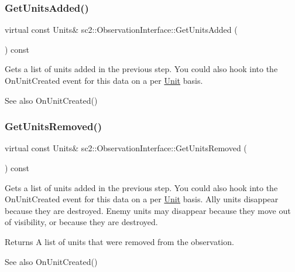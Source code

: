 \subsubsection{\texorpdfstring{Get\+Units\+Added()}{GetUnitsAdded()}}
{\footnotesize\ttfamily virtual const Units\& sc2\+::\+Observation\+Interface\+::\+Get\+Units\+Added (\begin{DoxyParamCaption}{ }\end{DoxyParamCaption}) const\hspace{0.3cm}{\ttfamily [pure virtual]}}

Gets a list of units added in the previous step. You could also hook into the On\+Unit\+Created event for this data on a per \hyperlink{classsc2_1_1_unit}{Unit} basis. \begin{DoxySeeAlso}{See also}
On\+Unit\+Created() 
\end{DoxySeeAlso}
\mbox{\label{classsc2_1_1_observation_interface_a656f51b87f1fafeeff37206345793476}} 
\subsubsection{\texorpdfstring{Get\+Units\+Removed()}{GetUnitsRemoved()}}
{\footnotesize\ttfamily virtual const Units\& sc2\+::\+Observation\+Interface\+::\+Get\+Units\+Removed (\begin{DoxyParamCaption}{ }\end{DoxyParamCaption}) const\hspace{0.3cm}{\ttfamily [pure virtual]}}

Gets a list of units added in the previous step. You could also hook into the On\+Unit\+Created event for this data on a per \hyperlink{classsc2_1_1_unit}{Unit} basis. Ally units disappear because they are destroyed. Enemy units may disappear because they move out of visibility, or because they are destroyed. \begin{DoxyReturn}{Returns}
A list of units that were removed from the observation. 
\end{DoxyReturn}
\begin{DoxySeeAlso}{See also}
On\+Unit\+Created() 
\end{DoxySeeAlso}
\mbox{\label{classsc2_1_1_observation_interface_ae80acee23f67a2b5f67fa511dd158aca}} 
